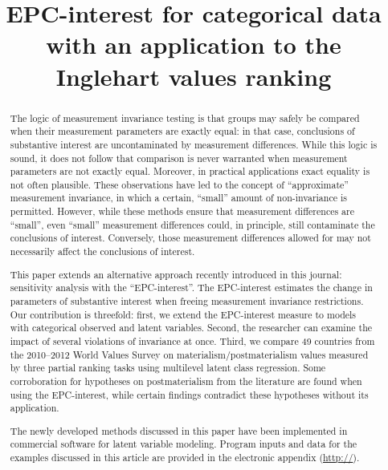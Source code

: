 \documentclass[letterpaper,12pt]{article}
\title{EPC-interest for categorical data with an application to the Inglehart values ranking}
\date{}
\author{\;}
\begin{document}
\maketitle



\begin{abstract}

The logic of measurement invariance testing is that groups may safely be compared when their measurement parameters are exactly equal: in that case, conclusions of substantive interest are uncontaminated by measurement differences. While this logic is sound, it does not follow that comparison is never warranted when measurement parameters are not exactly equal. Moreover, in practical applications exact equality is not often plausible. These observations have led to the concept of ``approximate'' measurement  invariance, in which a certain, ``small'' amount of non-invariance is permitted. 
However, while these methods ensure that measurement differences are ``small'', even ``small'' measurement differences could, in principle, still contaminate the conclusions of interest. Conversely, those measurement differences allowed for may not necessarily affect the conclusions of interest. 

This paper extends an alternative approach recently introduced in this journal: sensitivity analysis with the ``EPC-interest''. The EPC-interest estimates the change in parameters of substantive interest when freeing measurement invariance restrictions. Our contribution is threefold: first, we extend the EPC-interest measure to models with categorical observed and latent variables. Second, the researcher can examine the impact of several violations of invariance at once. Third, we compare 49 countries from the 2010--2012 World Values Survey on materialism/postmaterialism values measured by three partial ranking tasks using multilevel latent class regression. Some corroboration for hypotheses on postmaterialism from the literature are found when using the EPC-interest, while certain findings contradict these hypotheses without its application.

The newly developed methods discussed in this paper have been implemented in commercial software for latent variable modeling. Program inputs and data for the examples discussed in this article are provided in the electronic appendix (\url{http://}).
\end{abstract}
\end{document}
